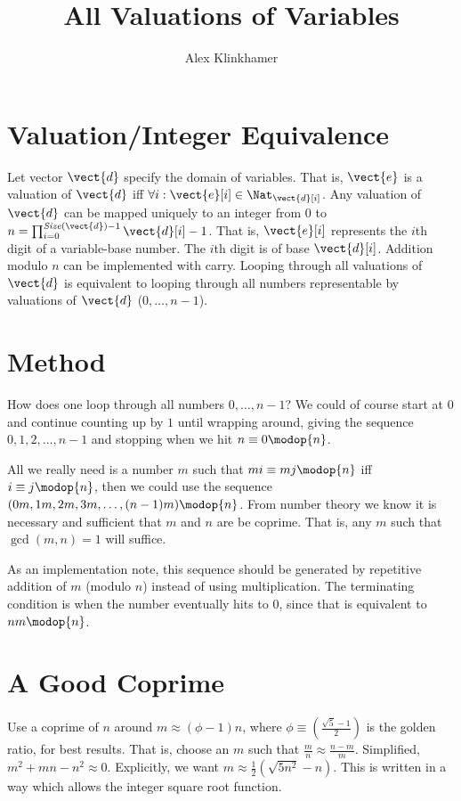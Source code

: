 



\title{All Valuations of Variables}
\author{Alex Klinkhamer}
\maketitle

\section{Valuation/Integer Equivalence}

Let vector $\vect{d}$ specify the domain of variables.
That is, $\vect{e}$ is a valuation of $\vect{d}$ iff $\forall i: \vect{e}[i]\in\Nat_{\vect{d}[i]}$.
Any valuation of $\vect{d}$ can be mapped uniquely to an integer from $0$ to $n=\prod_{i=0}^{\mathit{Size}(\vect{d})-1} \vect{d}[i]-1$.
That is, $\vect{e}[i]$ represents the $i$th digit of a variable-base number.
The $i$th digit is of base $\vect{d}[i]$.
Addition modulo $n$ can be implemented with carry.
Looping through all valuations of $\vect{d}$ is equivalent to looping through all numbers representable by valuations of $\vect{d}$ ($0,\dots,n-1$).

\section{Method}
How does one loop through all numbers $0,\dots,n-1$?
We could of course start at $0$ and continue counting up by $1$ until wrapping around, giving the sequence $0,1,2,\dots,n-1$ and stopping when we hit $n\equiv 0 \modop{n}$.

All we really need is a number $m$ such that $mi \equiv mj \modop{n}$ iff $i\equiv j \modop{n}$, then we could use the sequence $(0m,1m,2m,3m,\dots,(n-1)m)\modop{n}$.
From number theory we know it is necessary and sufficient that $m$ and $n$ are be coprime.
That is, any $m$ such that $\gcd(m,n)=1$ will suffice.

As an implementation note, this sequence should be generated by repetitive addition of $m$ (modulo $n$) instead of using multiplication.
The terminating condition is when the number eventually hits to $0$, since that is equivalent to $n m\modop{n}$.

\section{A Good Coprime}

Use a coprime of $n$ around $m\approx(\phi-1)n$, where $\phi\equiv (\frac{\sqrt{5}-1}{2})$ is the golden ratio, for best results.
That is, choose an $m$ such that $\frac{m}{n}\approx\frac{n-m}{m}$.
Simplified, $m^2+mn-n^2\approx 0$.
Explicitly, we want $m \approx \frac{1}{2}(\sqrt{5 n^2} - n)$.
This is written in a way which allows the integer square root function.

